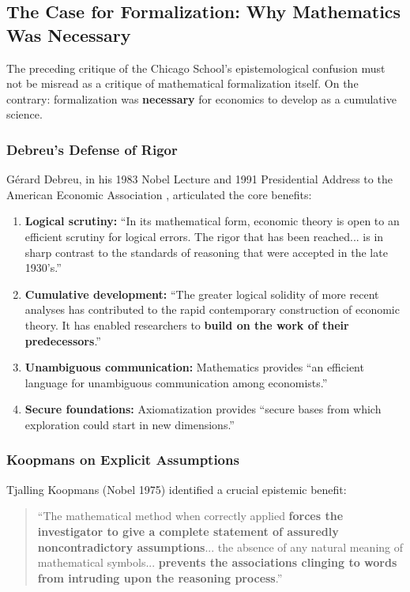 \subsection{The Case for Formalization: Why Mathematics Was Necessary}
\label{sec:meta-formalization}

The preceding critique of the Chicago School's epistemological confusion must not be
misread as a critique of mathematical formalization itself. On the contrary: formalization
was \textbf{necessary} for economics to develop as a cumulative science.

\subsubsection{Debreu's Defense of Rigor}

G\'{e}rard Debreu, in his 1983 Nobel Lecture and 1991 Presidential Address to the
American Economic Association \citep{debreu1984,debreu1991}, articulated the core benefits:

\begin{enumerate}[nosep]
    \item \textbf{Logical scrutiny:} ``In its mathematical form, economic theory is open
        to an efficient scrutiny for logical errors. The rigor that has been reached...
        is in sharp contrast to the standards of reasoning that were accepted in the
        late 1930's.''
    \item \textbf{Cumulative development:} ``The greater logical solidity of more recent
        analyses has contributed to the rapid contemporary construction of economic theory.
        It has enabled researchers to \textbf{build on the work of their predecessors}.''
    \item \textbf{Unambiguous communication:} Mathematics provides ``an efficient language
        for unambiguous communication among economists.''
    \item \textbf{Secure foundations:} Axiomatization provides ``secure bases from which
        exploration could start in new dimensions.''
\end{enumerate}

\subsubsection{Koopmans on Explicit Assumptions}

Tjalling Koopmans (Nobel 1975) identified a crucial epistemic benefit:
\begin{quote}
``The mathematical method when correctly applied \textbf{forces the investigator to give
a complete statement of assuredly noncontradictory assumptions}... the absence of any
natural meaning of mathematical symbols... \textbf{prevents the associations clinging
to words from intruding upon the reasoning process}.'' \citep{koopmans1957}
\end{quote}

